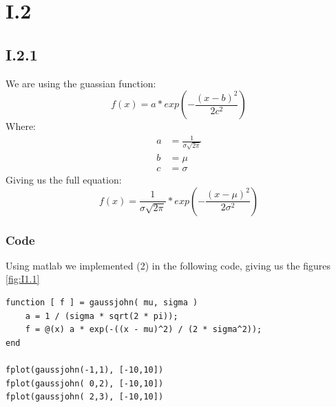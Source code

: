 \documentclass{article}
\begin{document}
\section{I.2}

\subsection{I.2.1}

We are using the guassian function:
\begin{equation}
    f(x) = a * exp\left(-\frac{(x-b)^2}{2c^2}\right)
\end{equation}
Where:
\begin{align*}
    a &= \frac{1}{\sigma \sqrt{2\pi}}\\
    b &= \mu\\
    c &= \sigma 
\end{align*}
Giving us the full equation:
\begin{equation}
    f(x) = \frac{1}{\sigma \sqrt{2\pi}} * exp\left(-\frac{(x-\mu)^2}{2\sigma^2}\right)
\end{equation}

\subsubsection{Code}
Using matlab we implemented (2) in the following code, giving us the figures \ref{fig:I1.1}

\begin{verbatim}
function [ f ] = gaussjohn( mu, sigma )
    a = 1 / (sigma * sqrt(2 * pi));
    f = @(x) a * exp(-((x - mu)^2) / (2 * sigma^2));
end

fplot(gaussjohn(-1,1), [-10,10])
fplot(gaussjohn( 0,2), [-10,10])
fplot(gaussjohn( 2,3), [-10,10])
\end{verbatim}
\end{document}
